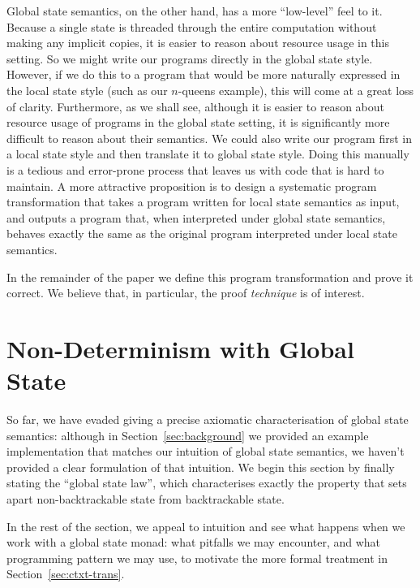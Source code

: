 \documentclass{jfp}
\begin{document}
Global state semantics, on the other hand, has a more ``low-level'' feel to it.
Because a single state is threaded through the entire computation without
making any implicit copies, it is easier to reason about resource usage in this
setting. So we might write our programs directly in the global state style.
However, if we do this to a program that would be more naturally expressed in
the local state style (such as our $n$-queens example), this will come at a
great loss of clarity. Furthermore, as we shall see, although it is easier to
reason about resource usage of programs in the global state setting, it is
significantly more difficult to reason about their semantics. We could also
write our program first in a local state style and then translate it to global
state style. Doing this manually is a tedious and error-prone process that
leaves us with code that is hard to maintain. A more attractive proposition is
to design a systematic program transformation that takes a program written for
local state semantics as input, and outputs a program that, when interpreted
under global state semantics, behaves exactly the same as the original program
interpreted under local state semantics.

In the remainder of the paper we define this program transformation and prove it
correct. We believe that, in particular, the proof \emph{technique} is of interest.

\section{Non-Determinism with Global State}
\label{sec:nd-state-global}
So far, we have evaded giving a precise axiomatic characterisation of global
state semantics: although in Section~\ref{sec:background} we provided an example
implementation that matches our intuition of global state semantics, we haven't
provided a clear formulation of that intuition. We begin this section by finally
stating the ``global state law'', which characterises exactly the property that
sets apart non-backtrackable state from backtrackable state.

In the rest of the section, we appeal to intuition and see what happens when we
work with a global state monad: what pitfalls we may encounter, and what
programming pattern we may use, to motivate the more formal treatment in
Section~\ref{sec:ctxt-trans}.
\end{document}
